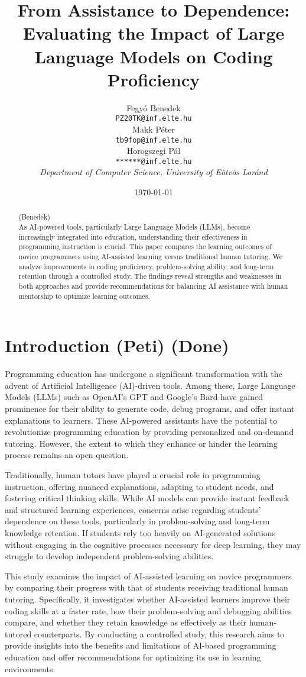 \documentclass[12pt]{article}  %
\title{From Assistance to Dependence: Evaluating the Impact of Large Language Models on Coding Proficiency}
\author{
  Fegyó Benedek\\
  \texttt{PZ20TK@inf.elte.hu} \\[1ex]
  Makk Péter\\
  \texttt{tb9fop@inf.elte.hu} \\[1ex]
  Horogszegi Pál\\
  \texttt{******@inf.elte.hu} \\[2ex]
  \textit{Department of Computer Science, University of Eötvös Loránd}
}
\date{\today}
\begin{document}
\maketitle

\begin{abstract}
    (Benedek)\\
    As AI-powered tools, particularly Large Language Models (LLMs), become increasingly integrated into education, understanding their effectiveness in programming instruction is crucial. This paper compares the learning outcomes of novice programmers using AI-assisted learning versus traditional human tutoring. We analyze improvements in coding proficiency, problem-solving ability, and long-term retention through a controlled study. The findings reveal strengths and weaknesses in both approaches and provide recommendations for balancing AI assistance with human mentorship to optimize learning outcomes.
\end{abstract}

\section{Introduction (Peti) (Done)}
\label{sec:intro}
Programming education has undergone a significant transformation with the advent of Artificial Intelligence (AI)-driven tools. Among these, Large Language Models (LLMs) such as OpenAI's GPT and Google's Bard have gained prominence for their ability to generate code, debug programs, and offer instant explanations to learners. These AI-powered assistants have the potential to revolutionize programming education by providing personalized and on-demand tutoring. However, the extent to which they enhance or hinder the learning process remains an open question.

Traditionally, human tutors have played a crucial role in programming instruction, offering nuanced explanations, adapting to student needs, and fostering critical thinking skills. While AI models can provide instant feedback and structured learning experiences, concerns arise regarding students' dependence on these tools, particularly in problem-solving and long-term knowledge retention. If students rely too heavily on AI-generated solutions without engaging in the cognitive processes necessary for deep learning, they may struggle to develop independent problem-solving abilities.

This study examines the impact of AI-assisted learning on novice programmers by comparing their progress with that of students receiving traditional human tutoring. Specifically, it investigates whether AI-assisted learners improve their coding skills at a faster rate, how their problem-solving and debugging abilities compare, and whether they retain knowledge as effectively as their human-tutored counterparts. By conducting a controlled study, this research aims to provide insights into the benefits and limitations of AI-based programming education and offer recommendations for optimizing its use in learning environments.
\end{document}
